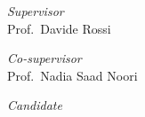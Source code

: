 \documentclass[../thesis.tex]{subfiles}
\begin{document}
    \begin{titlepage}
        \begin{center}
            \begin{LARGE}
                \textbf{\myUni}\\
            \end{LARGE}

            \vspace{10pt}

            \begin{large}
                \textsc{\myDepartment}\\
                \textsc{\myFaculty}\\
            \end{large}

            \vspace{10pt}

            \begin{LARGE}
                \begin{center}
                    \textbf{\myTitle}\\
                \end{center}
            \end{LARGE}

            \begin{large}
                \textsl{\myDegree}\\
            \end{large}

            \vspace{100pt}

            \begin{large}
                \begin{flushleft}
                    \textit{Supervisor}\\
                    \vspace{1pt}
                    Prof.\ Davide Rossi
                \end{flushleft}
                \begin{flushleft}
                    \textit{Co-supervisor}\\
                    \vspace{1pt}
                    Prof.\ Nadia Saad Noori
                \end{flushleft}
            
                \vspace{0pt} 

                \begin{flushright}
                    \textit{Candidate}\\
                    \vspace{1pt}
                    \myName
                \end{flushright}
            \end{large}


\end{center}
\end{titlepage}
\end{document}
